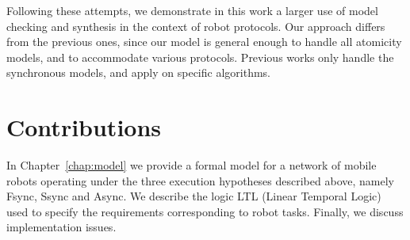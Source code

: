 \bigskip
Following these attempts, we demonstrate in this work a larger use of model checking and synthesis in the context of robot protocols. 
Our approach differs from the previous ones, since our model is general enough to handle all atomicity models, and to accommodate various protocols. Previous works only handle the synchronous models, and apply on specific algorithms. 


	\section{Contributions}
In Chapter~\ref{chap:model} we provide a
formal model for a network of mobile robots operating
under the three execution hypotheses described above, namely Fsync, Ssync
and Async.  We describe the logic \textsf{LTL} (Linear Temporal Logic) used to
specify the requirements corresponding to robot tasks.  Finally, we discuss implementation issues.

